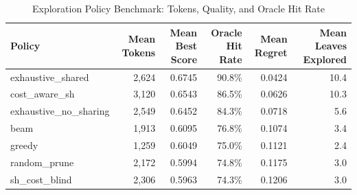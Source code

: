\begin{table}[htbp]
\centering
\caption{Exploration Policy Benchmark: Tokens, Quality, and Oracle Hit Rate}
\label{tab:policy_comparison}
\begin{tabular}{lrrrrr}
\toprule
Policy & Mean Tokens & Mean Best Score & Oracle Hit Rate & Mean Regret & Mean Leaves Explored \\
\midrule
exhaustive_shared & 2,624 & 0.6745 & 90.8\% & 0.0424 & 10.4 \\
cost_aware_sh & 3,120 & 0.6543 & 86.5\% & 0.0626 & 10.3 \\
exhaustive_no_sharing & 2,549 & 0.6452 & 84.3\% & 0.0718 & 5.6 \\
beam & 1,913 & 0.6095 & 76.8\% & 0.1074 & 3.4 \\
greedy & 1,259 & 0.6049 & 75.0\% & 0.1121 & 2.4 \\
random_prune & 2,172 & 0.5994 & 74.8\% & 0.1175 & 3.0 \\
sh_cost_blind & 2,306 & 0.5963 & 74.3\% & 0.1206 & 3.0 \\
\bottomrule
\end{tabular}
\end{table}
